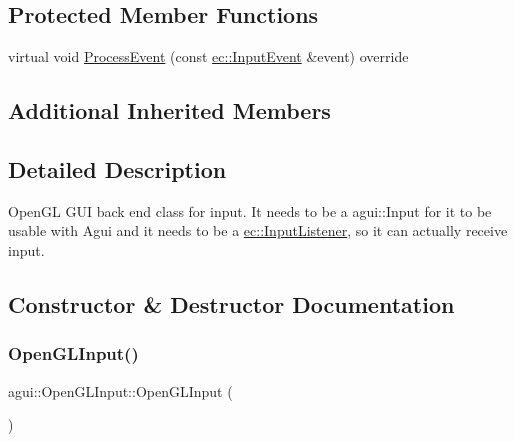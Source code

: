 \subsection*{Protected Member Functions}
\begin{DoxyCompactItemize}
\item 
virtual void \mbox{\hyperlink{classagui_1_1_open_g_l_input_afee8d588768cea3b75bcb3de36e03397}{Process\+Event}} (const \mbox{\hyperlink{structec_1_1_input_event}{ec\+::\+Input\+Event}} \&event) override
\end{DoxyCompactItemize}
\subsection*{Additional Inherited Members}


\subsection{Detailed Description}
Open\+GL G\+UI back end class for input. It needs to be a agui\+::\+Input for it to be usable with Agui and it needs to be a \mbox{\hyperlink{classec_1_1_input_listener}{ec\+::\+Input\+Listener}}, so it can actually receive input. 

\subsection{Constructor \& Destructor Documentation}
\mbox{\label{classagui_1_1_open_g_l_input_a39952038c9c55dd0096959aabdd1bcdd}} 
\subsubsection{\texorpdfstring{Open\+G\+L\+Input()}{OpenGLInput()}}
{\footnotesize\ttfamily agui\+::\+Open\+G\+L\+Input\+::\+Open\+G\+L\+Input (\begin{DoxyParamCaption}{ }\end{DoxyParamCaption})\hspace{0.3cm}{\ttfamily [explicit]}}

\mbox{\label{classagui_1_1_open_g_l_input_aea9e1ebeaad32419ad923654f96cc325}} 

